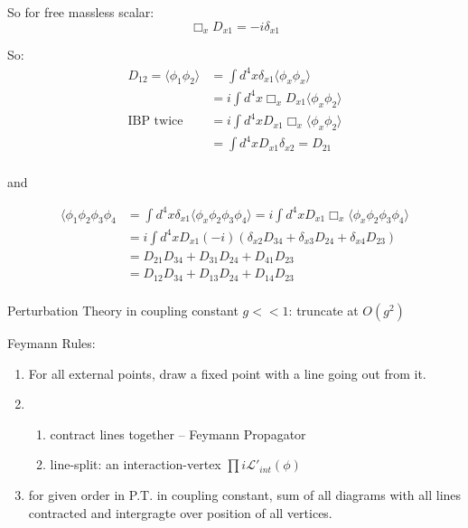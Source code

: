 So for free massless scalar:
\[
    \Box_xD_{x1} = -i\delta_{x1}
    \]

So:
\begin{equation}
    \begin{aligned}
	D_{12} = \langle\phi_1\phi_2\rangle &= \int d^4x\delta_{x1}\langle\phi_x\phi_x\rangle	\\
	&= i\int d^4x\Box_xD_{x1}\langle\phi_x\phi_2\rangle \\
	\text{IBP twice} &= i\int d^4xD_{x1}\Box_x\langle\phi_x\phi_2\rangle \\
	&= \int d^4xD_{x1}\delta_{x2} = D_{21}	\\
    \end{aligned}
\end{equation}

and 

\[
    \begin{aligned}
	\langle\phi_1\phi_2\phi_3\phi_4 &= \int d^4x\delta_{x1}\langle\phi_x\phi_2\phi_3\phi_4\rangle 
	= i\int d^4xD_{x1}\Box_x\langle\phi_x\phi_2\phi_3\phi_4\rangle	\\
	&= i\int d^4xD_{x1}(-i)(\delta_{x2}D_{34}+\delta_{x3}D_{24}+\delta_{x4}D_{23}) \\
	&= D_{21}D_{34} + D_{31}D_{24} + D_{41}D_{23}	\\
	&= D_{12}D_{34} + D_{13}D_{24} + D_{14}D_{23}	\\
    \end{aligned}
    \]

Perturbation Theory in coupling constant $g<<1$: truncate at $O(g^2)$

Feymann Rules:
\begin{enumerate}
    \item For all external points, draw a fixed point with a line going out from it.
    \item 
	\begin{enumerate}
	    \item contract lines together -- Feymann Propagator
	    \item line-split: an interaction-vertex $\prod i\mathcal{L}'_{int}(\phi)$
	\end{enumerate}
    \item for given order in P.T. in coupling constant, sum of all diagrams with all lines contracted 
	and intergragte over position of all vertices.
\end{enumerate}


